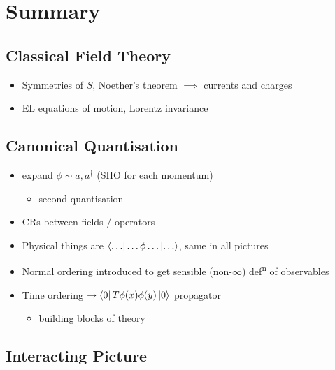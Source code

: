 
\chapter{Summary}%

\section*{Classical Field Theory}%

\begin{itemize}
  \item Symmetries of $S$, Noether's theorem $\implies$ currents and charges
  \item EL equations of motion, Lorentz invariance
\end{itemize}

\section*{Canonical Quantisation}%

\begin{itemize}
  \item expand $\phi \sim a, a^{\dagger}$ (SHO for each momentum)
    \begin{itemize}
      \item second quantisation
    \end{itemize}
  \item CRs between fields / operators
  \item Physical things are $\bra{ \dots } \dots \phi \dots \ket{ \dots }$, same in all pictures
  \item Normal ordering introduced to get sensible (non-$\infty$) def\textsuperscript{n} of observables
  \item Time ordering $\rightarrow \bra{0} T \phi(x) \phi(y) \ket{0}$ propagator
    \begin{itemize}
      \item building blocks of theory
    \end{itemize}
\end{itemize}

\section*{Interacting Picture}%

